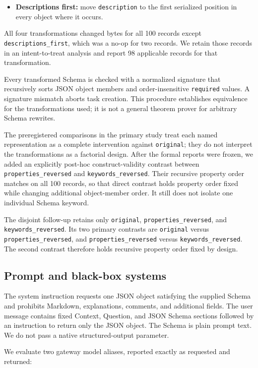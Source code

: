 \documentclass[10pt]{article}
\begin{document}
\begin{itemize}
\item \textbf{Descriptions first:} move \texttt{description} to the first serialized position in every object where it occurs.
\end{itemize}
All four transformations changed bytes for all 100 records except \texttt{descriptions\_first}, which was a no-op for two records. We retain those records in an intent-to-treat analysis and report 98 applicable records for that transformation.

Every transformed Schema is checked with a normalized signature that recursively sorts JSON object members and order-insensitive \texttt{required} values. A signature mismatch aborts task creation. This procedure establishes equivalence for the transformations used; it is not a general theorem prover for arbitrary Schema rewrites.

The preregistered comparisons in the primary study treat each named representation as a complete intervention against \texttt{original}; they do not interpret the transformations as a factorial design. After the formal reports were frozen, we added an explicitly post-hoc construct-validity contrast between \texttt{properties\_reversed} and \texttt{keywords\_reversed}. Their recursive property order matches on all 100 records, so that direct contrast holds property order fixed while changing additional object-member order. It still does not isolate one individual Schema keyword.

The disjoint follow-up retains only \texttt{original}, \texttt{properties\_reversed}, and \texttt{keywords\_reversed}. Its two primary contrasts are \texttt{original} versus \texttt{properties\_reversed}, and \texttt{properties\_reversed} versus \texttt{keywords\_reversed}. The second contrast therefore holds recursive property order fixed by design.

\subsection{Prompt and black-box systems}
The system instruction requests one JSON object satisfying the supplied Schema and prohibits Markdown, explanations, comments, and additional fields. The user message contains fixed Context, Question, and JSON Schema sections followed by an instruction to return only the JSON object. The Schema is plain prompt text. We do not pass a native structured-output parameter.

We evaluate two gateway model aliases, reported exactly as requested and returned:
\end{document}
